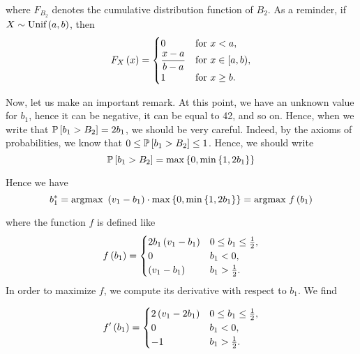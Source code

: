 where $F_{B_2}$ denotes the cumulative distribution function of $B_{2}$. As a reminder, if $X \sim \text{Unif} \parent{a, b}$, then
\begin{equation*}
F_{X} \parent{x} =
\begin{cases}
    0                   & {\text{for }} x<a, \\
    \dfrac{x-a}{b-a}    & {\text{for }} x \in [a,b), \\
    1                   & {\text{for }} x \geq b.
\end{cases}
\end{equation*}

\vspace{5mm}

Now, let us make an important remark. At this point, we have an unknown value for $b_1$, hence it can be negative, it can be equal to 42, and so on. Hence, when we write that $\mathbb{P} \squared{b_1 > B_2} = 2 b_1$, we should be very careful. Indeed, by the axioms of probabilities, we know that $0 \leq \mathbb{P} \squared{b_1 > B_2} \leq 1$. Hence, we should write
\begin{equation*}
    \mathbb{P} \squared{b_1 > B_2} = \max \bracket{0, \min \bracket{1, 2 b_1}}
\end{equation*}

Hence we have
\begin{equation*}
    b_1^{*}
    = \text{argmax} \ \parent{v_1 - b_1} \cdot \max \bracket{0, \min \bracket{1, 2 b_1}}
    = \text{argmax} \ f \parent{b_1}
\end{equation*}

where the function $f$ is defined like
\begin{equation*}
    f \parent{b_1}
    =
    \begin{cases}
       2 b_1 \parent{v_1 - b_1}  & 0 \leq b_1 \leq \frac{1}{2}, \\
       0 & b_1 < 0, \\
       \parent{v_1 - b_1} & b_1 > \frac{1}{2}. \\
     \end{cases}
\end{equation*}
In order to maximize $f$, we compute its derivative with respect to $b_1$. We find

\begin{equation*}
    f' \parent{b_1}
    =
    \begin{cases}
       2 \parent{v_1 - 2 b_1}  & 0 \leq b_1 \leq \frac{1}{2}, \\
       0 & b_1 < 0, \\
       -1 & b_1 > \frac{1}{2}. \\
     \end{cases}
\end{equation*}

